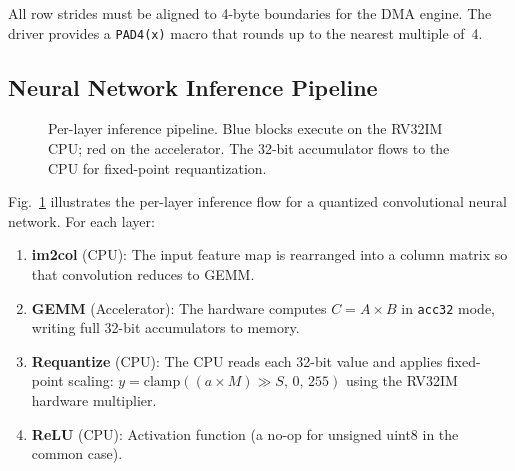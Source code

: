 \documentclass[conference]{IEEEtran}
\begin{document}
All row strides must be aligned to 4-byte boundaries for the DMA engine. The driver provides a \texttt{PAD4(x)} macro that rounds up to the nearest multiple of~4.

\subsection{Neural Network Inference Pipeline}

\begin{figure}[t]
\centering
{}
\caption{Per-layer inference pipeline. Blue blocks execute on the RV32IM CPU; red on the accelerator. The 32-bit accumulator flows to the CPU for fixed-point requantization.}
\label{fig:pipeline}
\end{figure}

Fig.~\ref{fig:pipeline} illustrates the per-layer inference flow for a quantized convolutional neural network. For each layer:

\begin{enumerate}
    \item \textbf{im2col} (CPU): The input feature map is rearranged into a column matrix so that convolution reduces to GEMM.
    \item \textbf{GEMM} (Accelerator): The hardware computes $C = A \times B$ in \texttt{acc32} mode, writing full 32-bit accumulators to memory.
    \item \textbf{Requantize} (CPU): The CPU reads each 32-bit value and applies fixed-point scaling: $y = \text{clamp}((a \times M) \gg S,\, 0,\, 255)$ using the RV32IM hardware multiplier.
    \item \textbf{ReLU} (CPU): Activation function (a no-op for unsigned uint8 in the common case).
\end{enumerate}
\end{document}
